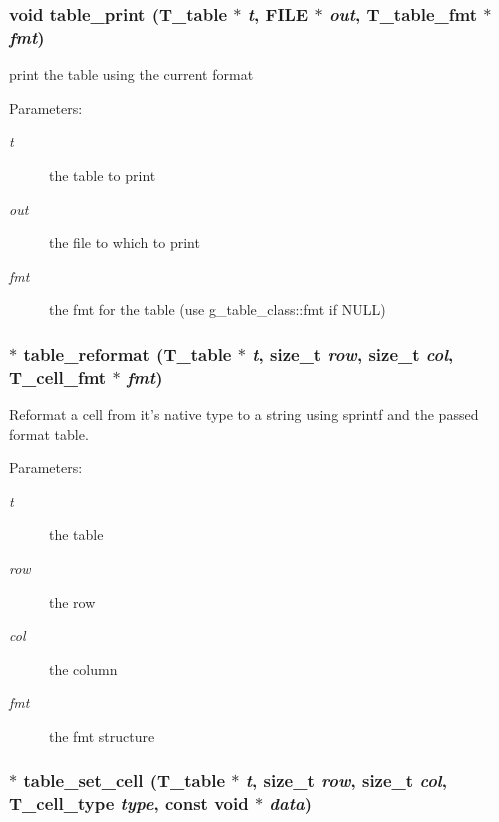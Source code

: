 \subsubsection{\setlength{\rightskip}{0pt plus 5cm}void table\_\-print ({\bf T\_\-table} $\ast$ {\em t}, FILE $\ast$ {\em out}, {\bf T\_\-table\_\-fmt} $\ast$ {\em fmt})}\label{group__simple__table_a14}


print the table using the current format\begin{Desc}
\item[Parameters: ]\par
\begin{description}
\item[{\em 
t}]the table to print \item[{\em 
out}]the file to which to print \item[{\em 
fmt}]the fmt for the table (use g\_\-table\_\-class::fmt if NULL) \end{description}
\end{Desc}
\subsubsection{$\ast$ table\_\-reformat ({\bf T\_\-table} $\ast$ {\em t}, size\_\-t {\em row}, size\_\-t {\em col}, {\bf T\_\-cell\_\-fmt} $\ast$ {\em fmt})}\label{group__simple__table_a12}


Reformat a cell from it's native type to a string using sprintf and the passed format table. \begin{Desc}
\item[Parameters: ]\par
\begin{description}
\item[{\em 
t}]the table \item[{\em 
row}]the row \item[{\em 
col}]the column \item[{\em 
fmt}]the fmt structure \end{description}
\end{Desc}
\subsubsection{$\ast$ table\_\-set\_\-cell ({\bf T\_\-table} $\ast$ {\em t}, size\_\-t {\em row}, size\_\-t {\em col}, {\bf T\_\-cell\_\-type} {\em type}, const void $\ast$ {\em data})}\label{group__simple__table_a7}


